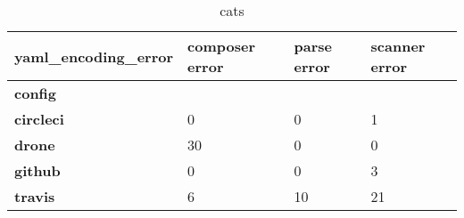 \begin {table}[!htbp]

\caption{cats}
\begin{tabular}{|l|l|l|l|}
\hline
\textbf{yaml\_encoding\_error} &  composer error &  parse error &  scanner error \\ \hline
\textbf{config  } &                 &              &                \\ \hline

\textbf{circleci} &               0 &            0 &              1 \\ \hline
\textbf{drone   } &              30 &            0 &              0 \\ \hline
\textbf{github  } &               0 &            0 &              3 \\ \hline
\textbf{travis  } &               6 &           10 &             21 \\ \hline

\end{tabular}
\end{table}
